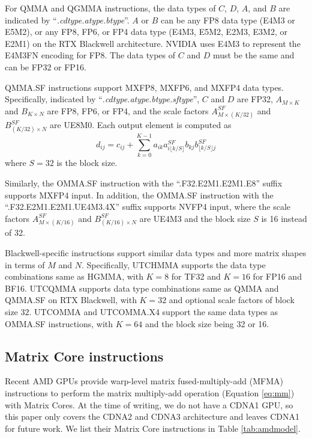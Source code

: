 For QMMA and QGMMA instructions, the data types of $C$, $D$, $A$, and $B$ are indicated by ``\textit{.cdtype.atype.btype}''. $A$ or $B$ can be any FP8 data type (E4M3 or E5M2), or any FP8, FP6, or FP4 data type (E4M3, E5M2, E2M3, E3M2, or E2M1) on the RTX Blackwell architecture. NVIDIA uses E4M3 to represent the E4M3FN encoding for FP8. The data types of $C$ and $D$ must be the same and can be FP32 or FP16. 

QMMA.SF instructions support MXFP8, MXFP6, and MXFP4 data types. Specifically, indicated by ``\textit{.cdtype.atype.btype.sftype}'', $C$ and $D$ are FP32, $A_{M\times K}$ and $B_{K\times N}$ are FP8, FP6, or FP4, and the scale factors $A^{SF}_{M\times (K/32)}$ and $B^{SF}_{(K/32)\times N}$ are UE8M0. Each output element is computed as
\begin{equation}
\label{eq:mxfpmm}
d_{ij}=c_{ij} + \sum_{k=0}^{K-1}a_{ik}a^{SF}_{i\lfloor k/S \rfloor}b_{kj}b^{SF}_{\lfloor k/S \rfloor j}
\end{equation}
where $S=32$ is the block size.

Similarly, the OMMA.SF instruction with the ``.F32.E2M1.E2M1.E8'' suffix supports MXFP4 input. In addition, the OMMA.SF instruction with the ``.F32.E2M1.E2M1.UE4M3.4X'' suffix supports NVFP4 input, where the scale factors $A^{SF}_{M\times (K/16)}$ and $B^{SF}_{(K/16)\times N}$ are UE4M3 and the block size $S$ is 16 instead of 32.

Blackwell-specific instructions support similar data types and more matrix shapes in terms of $M$ and $N$. Specifically, UTCHMMA supports the data type combinations same as HGMMA, with $K=8$ for TF32 and $K=16$ for FP16 and BF16. UTCQMMA supports data type combinations same as QMMA and QMMA.SF on RTX Blackwell, with $K=32$ and optional scale factors of block size $32$. UTCOMMA and UTCOMMA.X4 support the same data types as OMMA.SF instructions, with $K=64$ and the block size being 32 or 16.

\subsection{Matrix Core instructions}

Recent AMD GPUs provide warp-level matrix fused-multiply-add (MFMA) instructions to perform the matrix multiply-add operation (Equation \ref{eq:mm}) with Matrix Cores. At the time of writing, we do not have a CDNA1 GPU, so this paper only covers the CDNA2 and CDNA3 architecture and leaves CDNA1 for future work. We list their Matrix Core instructions in Table \ref{tab:amdmodel}.

